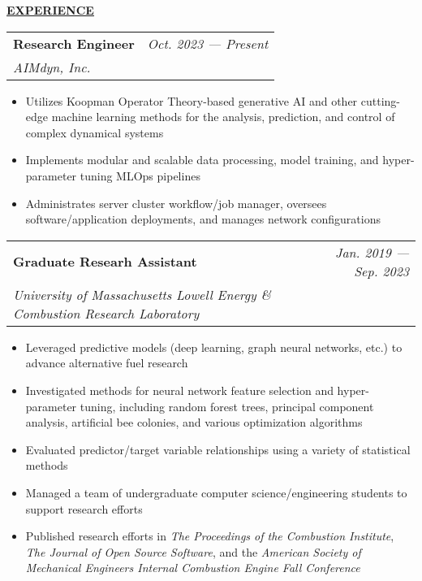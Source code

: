\documentclass{letter}
\begin{document}
    \medskip \large \textbf{\underline{EXPERIENCE}} \medskip \normalsize

    \setlength\tabcolsep{0cm}
    \begin{tabular*}{\linewidth}{L r}
        \textbf{Research Engineer} & \textit{Oct. 2023 --- Present} \\
        \textit{AIMdyn, Inc.} & 
    \end{tabular*}

    \small
    \begin{itemize}[leftmargin=0.75cm]
        \setlength{\itemsep}{0pt}
        \item Utilizes Koopman Operator Theory-based generative AI and other cutting-edge machine learning methods for the analysis, prediction, and control of complex dynamical systems
        \item Implements modular and scalable data processing, model training, and hyper-parameter tuning MLOps pipelines
        \item Administrates server cluster workflow/job manager, oversees software/application deployments, and manages network configurations
    \end{itemize}
    \normalsize

    \begin{tabular*}{\linewidth}{L r}
        \textbf{Graduate Researh Assistant} & \textit{Jan. 2019 --- Sep. 2023} \\
        \textit{University of Massachusetts Lowell Energy \& Combustion Research Laboratory} & 
    \end{tabular*}

    \small
    \begin{itemize}[leftmargin=0.75cm]
        \setlength{\itemsep}{0pt}
        \item Leveraged predictive models (deep learning, graph neural networks, etc.) to advance alternative fuel research
        \item Investigated methods for neural network feature selection and hyper-parameter tuning, including random forest trees, principal component analysis, artificial bee colonies, and various optimization algorithms
        \item Evaluated predictor/target variable relationships using a variety of statistical methods
        \item Managed a team of undergraduate computer science/engineering students to support research efforts
        \item Published research efforts in \textit{The Proceedings of the Combustion Institute}, \textit{The Journal of Open Source Software}, and the \textit{American Society of Mechanical Engineers Internal Combustion Engine Fall Conference}
    \end{itemize}
    \normalsize
\end{document}
